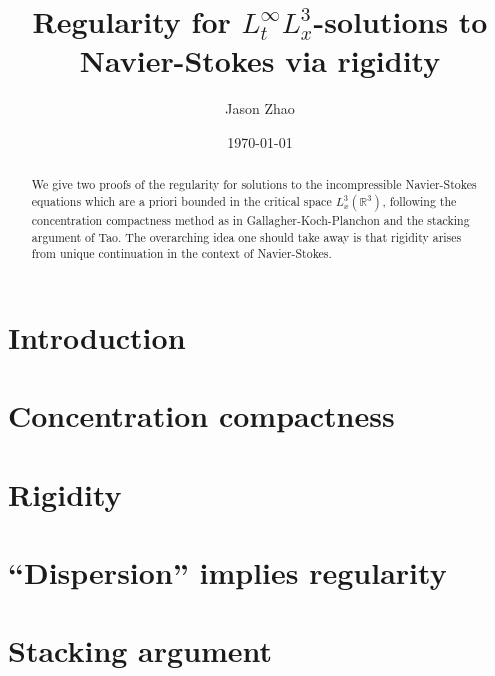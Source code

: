 \documentclass[reqno]{amsart}
\title
{
	Regularity for $L^\infty_t L^3_x$-solutions to Navier-Stokes via rigidity
}
\author{Jason Zhao}
\date{\today}
\begin{document}
\maketitle

\begin{abstract}
	We give two proofs of the regularity for solutions to the incompressible Navier-Stokes equations which are a priori bounded in the critical space $L^3_x (\mathbb R^3)$, following the concentration compactness method as in Gallagher-Koch-Planchon and the stacking argument of Tao. The overarching idea one should take away is that rigidity arises from unique continuation in the context of Navier-Stokes. 
\end{abstract}

\tableofcontents

\section{Introduction}


\section{Concentration compactness}\label{sec:cc}


\section{Rigidity}\label{sec:rigid}


\section{``Dispersion'' implies regularity}\label{sec:disperse}


\section{Stacking argument}\label{sec:stack}




\end{document}
